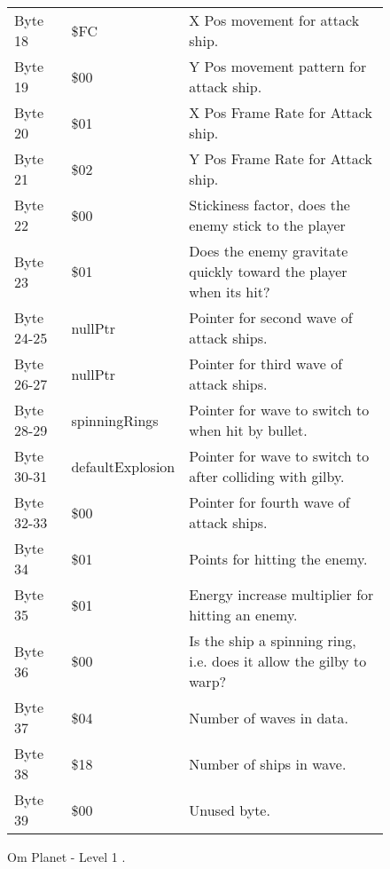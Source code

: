 \begin{figure}[H]
{\begin{adjustbox}{width=12cm}
\begin{tabular}{lll}
 Byte 18    & \$FC                       & X Pos movement for attack ship.                                     \\
 Byte 19    & \$00                       & Y Pos movement pattern for attack ship.                             \\
 Byte 20    & \$01                       & X Pos Frame Rate for Attack ship.                                   \\
 Byte 21    & \$02                       & Y Pos Frame Rate for Attack ship.                                   \\
 Byte 22    & \$00                       & Stickiness factor, does the enemy stick to the player               \\
 Byte 23    & \$01                       & Does the enemy gravitate quickly toward the player when its hit?    \\
 Byte 24-25 & nullPtr                   & Pointer for second wave of attack ships.                            \\
 Byte 26-27 & nullPtr                   & Pointer for third wave of attack ships.                             \\
 Byte 28-29 & spinningRings             & Pointer for wave to switch to when hit by bullet.                   \\
 Byte 30-31 & defaultExplosion          & Pointer for  wave to switch to after colliding with gilby.          \\
 Byte 32-33 & \$00                       & Pointer for fourth wave of attack ships.                            \\
 Byte 34    & \$01                       & Points for hitting the enemy.                                       \\
 Byte 35    & \$01                       & Energy increase multiplier for hitting an enemy.                    \\
 Byte 36    & \$00                       & Is the ship a spinning ring, i.e. does it allow the gilby to warp?  \\
 Byte 37    & \$04                       & Number of waves in data.                                            \\
 Byte 38    & \$18                       & Number of ships in wave.                                            \\
 Byte 39    & \$00                       & Unused byte.                                                        \\
\bottomrule
\end{tabular}

  \end{adjustbox}

  }\caption*{Om Planet - Level 1
.}
\end{figure}

